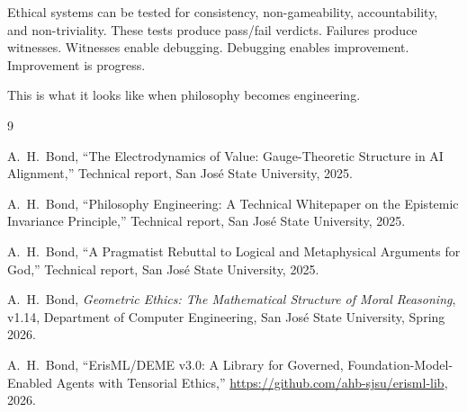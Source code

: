 \documentclass[12pt]{article}
\begin{document}
Ethical systems can be tested for consistency, non-gameability, accountability, and
non-triviality. These tests produce pass/fail verdicts. Failures produce witnesses.
Witnesses enable debugging. Debugging enables improvement. Improvement is
progress.

This is what it looks like when philosophy becomes engineering.

\begin{thebibliography}{9}

A.~H.~Bond, ``The Electrodynamics of Value: Gauge-Theoretic Structure in AI
Alignment,'' Technical report, San Jos\'{e} State University, 2025.

A.~H.~Bond, ``Philosophy Engineering: A Technical Whitepaper on the Epistemic
Invariance Principle,'' Technical report, San Jos\'{e} State University, 2025.

A.~H.~Bond, ``A Pragmatist Rebuttal to Logical and Metaphysical Arguments for God,''
Technical report, San Jos\'{e} State University, 2025.

A.~H.~Bond, \emph{Geometric Ethics: The Mathematical Structure of Moral Reasoning}, v1.14, Department of Computer Engineering, San Jos\'e State University, Spring 2026.

A.~H.~Bond, ``ErisML/DEME v3.0: A Library for Governed, Foundation-Model-Enabled Agents with Tensorial Ethics,'' \url{https://github.com/ahb-sjsu/erisml-lib}, 2026.

\end{thebibliography}
\end{document}
